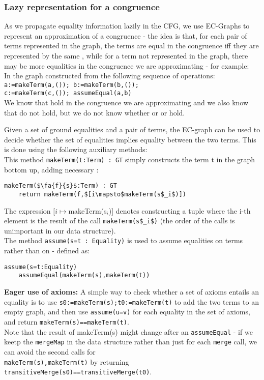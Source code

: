 \subsubsection*{Lazy representation for a congruence}
As we propagate equality information lazily in the CFG, we use EC-Graphs to represent an approximation of a congruence - the idea is that, for each pair of terms represented in the graph, the terms are equal in the congruence iff they are represented by the same \GT{}, while for a term not represented in the graph, there may be more equalities in the congruence we are approximating - for example:\\
In the graph constructed from the following sequence of operations:\\
\lstinline|a:=makeTerm(a,()); b:=makeTerm(b,());|\\
\lstinline|c:=makeTerm(c,()); assumeEqual(a,b)|\\
We know that  hold in the congruence we are approximating and we also know that  do not hold, 
but we do not know whether  or  or  hold.

\bigskip
\noindent
Given a set of ground equalities and a pair of terms, the EC-graph can be used to decide whether the set of equalities implies equality between the two terms. This is done using the following auxiliary methods:\\
This method \lstinline|makeTerm(t:Term) : GT| simply constructs the term t in the graph bottom up, adding necessary \GTs{}:
\begin{lstlisting}
makeTerm($\fa{f}{s}$:Term) : GT
	return makeTerm(f,$[i\mapsto$makeTerm(s$_i$)])
\end{lstlisting}
The expression $[i\mapsto$makeTerm(s$_i$)] denotes constructing a tuple where the i-th element is the result of the call \lstinline|makeTerm(s$_i$)| (the order of the calls is unimportant in our data structure).\\
The method \lstinline|assume(s=t : Equality)| is used to assume equalities on terms rather than on \GTs{} - defined as:
\begin{lstlisting}
assume(s=t:Equality)
	assumeEqual(makeTerm(s),makeTerm(t))
\end{lstlisting}

\bigskip
\noindent
\textbf{Eager use of axioms:}
A simple way to check whether a set of axioms entails an equality  is to use \lstinline|s0:=makeTerm(s);t0:=makeTerm(t)| to add the two terms to an empty graph, and then use
\lstinline|assume(u=v)| for each equality  in the set of axioms, and return \lstinline|makeTerm(s)==makeTerm(t)|.\\
Note that the result of makeTerm(s) might change after an \lstinline|assumeEqual| - if we keetp the \lstinline|mergeMap| in the data structure rather than just for each \lstinline|merge| call, we can avoid the second calls for\\ \lstinline|makeTerm(s),makeTerm(t)| by returning \lstinline|transitiveMerge(s0)==transitiveMerge(t0)|.

